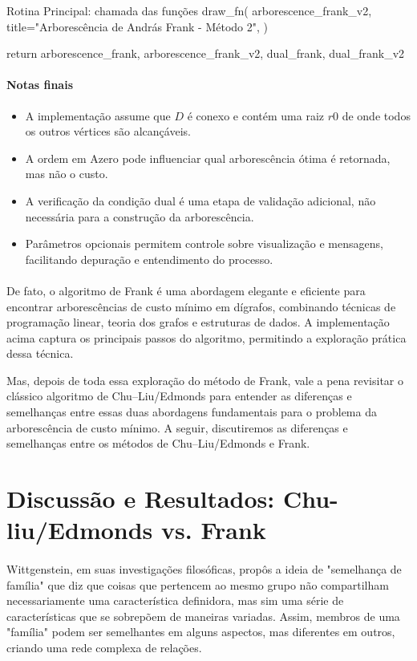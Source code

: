 \documentclass[12pt,a4paper]{article}
\def\texttt#1{#1}%
\def\_{}%
\begin{document}
\begin{pybox}{Rotina Principal: chamada das funções}
                    draw_fn(
                        arborescence_frank_v2,
                        title="Arborescência de András Frank - Método 2",
                    )

    return arborescence_frank, arborescence_frank_v2, dual_frank, dual_frank_v2
\end{pybox}

\paragraph{Notas finais}
\begin{itemize}\setlength{\itemsep}{2pt}
    \item A implementação assume que \(D\) é conexo e contém uma raiz \(r0\) de onde todos os outros vértices são alcançáveis.
    \item A ordem em \texttt{A\_zero} pode influenciar qual arborescência ótima é retornada, mas não o custo.
    \item A verificação da condição dual é uma etapa de validação adicional, não necessária para a construção da arborescência.
    \item Parâmetros opcionais permitem controle sobre visualização e mensagens, facilitando depuração e entendimento do processo.
\end{itemize}

\paragraph{}
De fato, o algoritmo de Frank é uma abordagem elegante e eficiente para encontrar arborescências de custo mínimo em dígrafos, combinando técnicas de programação linear, teoria dos grafos e estruturas de dados. A implementação acima captura os principais passos do algoritmo, permitindo a exploração prática dessa técnica. 

Mas, depois de toda essa exploração do método de Frank, vale a pena revisitar o clássico algoritmo de Chu–Liu/Edmonds para entender as diferenças e semelhanças entre essas duas abordagens fundamentais para o problema da arborescência de custo mínimo. A seguir, discutiremos as diferenças e semelhanças entre os métodos de Chu–Liu/Edmonds e Frank.

\section{Discussão e Resultados: Chu-liu/Edmonds vs. Frank}

\paragraph{}
Wittgenstein, em suas investigações filosóficas, propôs a ideia de "semelhança de família" que diz que coisas que pertencem ao mesmo grupo não compartilham necessariamente uma característica definidora, mas sim uma série de características que se sobrepõem de maneiras variadas. Assim, membros de uma "família" podem ser semelhantes em alguns aspectos, mas diferentes em outros, criando uma rede complexa de relações.
\end{document}
